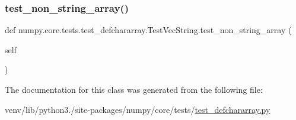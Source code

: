 \subsubsection{\texorpdfstring{test\+\_\+non\+\_\+string\+\_\+array()}{test\_non\_string\_array()}}
{\footnotesize\ttfamily def numpy.\+core.\+tests.\+test\+\_\+defchararray.\+Test\+Vec\+String.\+test\+\_\+non\+\_\+string\+\_\+array (\begin{DoxyParamCaption}\item[{}]{self }\end{DoxyParamCaption})}



The documentation for this class was generated from the following file\+:\begin{DoxyCompactItemize}
\item 
venv/lib/python3./site-\/packages/numpy/core/tests/\hyperlink{test__defchararray_8py}{test\+\_\+defchararray.\+py}\end{DoxyCompactItemize}
